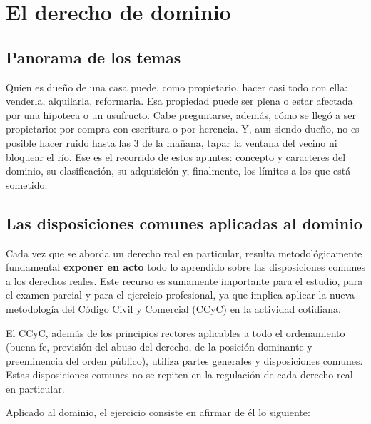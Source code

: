 \documentclass[12pt,oneside]{book}
\begin{document}

\chapter[El derecho de dominio]{El derecho de dominio}

\section{Panorama de los temas}

Quien es dueño de una casa puede, como propietario, hacer casi todo con ella: venderla, alquilarla, reformarla. Esa propiedad puede ser plena o estar afectada por una hipoteca o un usufructo. Cabe preguntarse, además, cómo se llegó a ser propietario: por compra con escritura o por herencia. Y, aun siendo dueño, no es posible hacer ruido hasta las 3 de la mañana, tapar la ventana del vecino ni bloquear el río. Ese es el recorrido de estos apuntes: concepto y caracteres del dominio, su clasificación, su adquisición y, finalmente, los límites a los que está sometido.

\section{Las disposiciones comunes aplicadas al dominio}

Cada vez que se aborda un derecho real en particular, resulta metodológicamente fundamental \textbf{exponer en acto} todo lo aprendido sobre las disposiciones comunes a los derechos reales. Este recurso es sumamente importante para el estudio, para el examen parcial y para el ejercicio profesional, ya que implica aplicar la nueva metodología del Código Civil y Comercial (CCyC) en la actividad cotidiana.

El CCyC, además de los principios rectores aplicables a todo el ordenamiento (buena fe, previsión del abuso del derecho, de la posición dominante y preeminencia del orden público), utiliza partes generales y disposiciones comunes. Estas disposiciones comunes no se repiten en la regulación de cada derecho real en particular.

Aplicado al dominio, el ejercicio consiste en afirmar de él lo siguiente:
\end{document}
